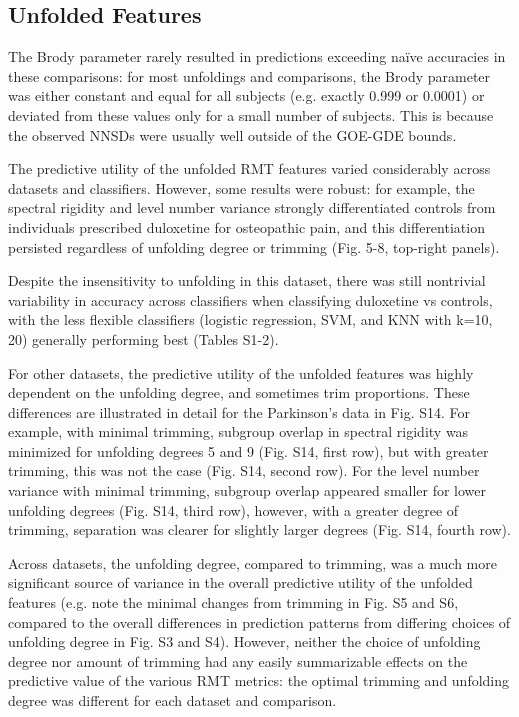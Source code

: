 \subsection{Unfolded Features}
The Brody parameter rarely resulted in predictions exceeding naïve accuracies in these comparisons:
for most unfoldings and comparisons, the Brody parameter was either constant and equal for all
subjects (e.g. exactly 0.999 or 0.0001) or deviated from these values only for a small number of
subjects. This is because the observed NNSDs were usually well outside of the GOE-GDE bounds.

The predictive utility of the unfolded RMT features varied considerably across datasets and
classifiers. However, some results were robust: for example, the spectral rigidity and level number
variance strongly differentiated controls from individuals prescribed duloxetine for osteopathic
pain, and this differentiation persisted regardless of unfolding degree or trimming (Fig. 5-8, top-right panels).

Despite the insensitivity to unfolding in this dataset, there was still nontrivial variability in
accuracy across classifiers when classifying duloxetine vs controls, with the less flexible
classifiers (logistic regression, SVM, and KNN with k=10, 20) generally performing best (Tables
S1-2).

For other datasets, the predictive utility of the unfolded features was highly dependent on the
unfolding degree, and sometimes trim proportions. These differences are illustrated in detail for
the Parkinson's data in Fig. S14. For example, with minimal trimming, subgroup overlap in spectral
rigidity was minimized for unfolding degrees 5 and 9 (Fig. S14, first row), but with greater
trimming, this was not the case (Fig. S14, second row). For the level number variance with minimal
trimming, subgroup overlap appeared smaller for lower unfolding degrees (Fig. S14, third row),
however, with a greater degree of trimming, separation was clearer for slightly larger degrees (Fig.
S14, fourth row).

Across datasets, the unfolding degree, compared to trimming, was a much more significant source of
variance in the overall predictive utility of the unfolded features (e.g. note the minimal changes
from trimming in Fig. S5 and S6, compared to the overall differences in prediction patterns from
differing choices of unfolding degree in Fig. S3 and S4). However, neither the choice of unfolding
degree nor amount of trimming had any easily summarizable effects on the predictive value of the
various RMT metrics: the optimal trimming and unfolding degree was different for each dataset and
comparison.

